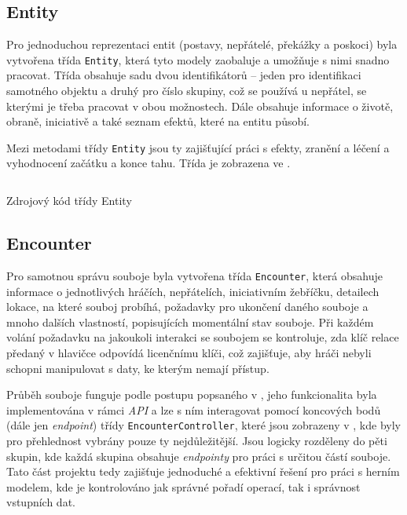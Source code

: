 \subsection{Entity}
\label{subsec:impl_entity}

Pro jednoduchou reprezentaci entit (postavy, nepřátelé, překážky a poskoci) byla vytvořena třída \texttt{Entity}, která tyto modely zaobaluje a umožňuje s nimi snadno pracovat. Třída obsahuje sadu dvou identifikátorů -- jeden pro identifikaci samotného objektu a druhý pro číslo skupiny, což se používá u nepřátel, se kterými je třeba pracovat v obou možnostech. Dále obsahuje informace o životě, obraně, iniciativě a také seznam efektů, které na entitu působí.

Mezi metodami třídy \texttt{Entity} jsou ty zajišťující práci s efekty, zranění a léčení a vyhodnocení začátku a konce tahu. Třída je zobrazena ve .

\begin{listing}[H]
    \inputminted{Java}{code/EncounterEntity.java}
    \caption{Zdrojový kód třídy Entity}
    \label{code:entity}
\end{listing}


\subsection{Encounter}
\label{subsec:impl_encounter}

Pro samotnou správu souboje byla vytvořena třída \texttt{Encounter}, která obsahuje informace o jednotlivých hráčích, nepřátelích, iniciativním žebříčku, detailech lokace, na které souboj probíhá, požadavky pro ukončení daného souboje a mnoho dalších vlastností, popisujících momentální stav souboje. Při každém volání požadavku na jakoukoli interakci se soubojem se kontroluje, zda klíč relace předaný v hlavičce odpovídá licenčnímu klíči, což zajišťuje, aby hráči nebyli schopni manipulovat s daty, ke kterým nemají přístup. 

Průběh souboje funguje podle postupu popsaného v , jeho funkcionalita byla implementována v rámci \textit{API} a lze s ním interagovat pomocí koncových bodů (dále jen \textit{endpoint}) třídy \texttt{EncounterController}, které jsou zobrazeny v , kde byly pro přehlednost vybrány pouze ty nejdůležitější. Jsou logicky rozděleny do pěti skupin, kde každá skupina obsahuje \textit{endpointy} pro práci s určitou částí souboje. Tato část projektu tedy zajišťuje jednoduché a efektivní řešení pro práci s herním modelem, kde je kontrolováno jak správné pořadí operací, tak i správnost vstupních dat.

